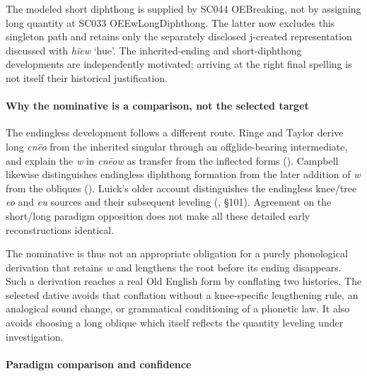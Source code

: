 \documentclass[
  british,
  a4paper,
]{article}
\begin{document}
The modeled short diphthong is supplied by SC044 OEBreaking, not by
assigning long quantity at SC033 OEEwLongDiphthong. The latter now
excludes this singleton path and retains only the separately disclosed
j-created representation discussed with \emph{hīew} `hue'. The
inherited-ending and short-diphthong developments are independently
motivated; arriving at the right final spelling is not itself their
historical justification.

\paragraph{Why the nominative is a comparison, not the selected
target}\label{why-the-nominative-is-a-comparison-not-the-selected-target}

The endingless development follows a different route. Ringe and Taylor
derive long \emph{cnēo} from the inherited singular through an
offglide-bearing intermediate, and explain the \emph{w} in \emph{cnēow}
as transfer from the inflected forms
().
Campbell likewise distinguishes endingless diphthong formation from the
later addition of \emph{w} from the obliques
(). Luick's
older account distinguishes the endingless knee/tree \emph{eo} and
\emph{eu} sources and their subsequent leveling
(, §101). Agreement on
the short/long paradigm opposition does not make all these detailed
early reconstructions identical.

The nominative is thus not an appropriate obligation for a purely
phonological derivation that retains \emph{w} and lengthens the root
before its ending disappears. Such a derivation reaches a real Old
English form by conflating two histories. The selected dative avoids
that conflation without a knee-specific lengthening rule, an analogical
sound change, or grammatical conditioning of a phonetic law. It also
avoids choosing a long oblique which itself reflects the quantity
leveling under investigation.

\paragraph{Paradigm comparison and
confidence}\label{paradigm-comparison-and-confidence}
\end{document}
